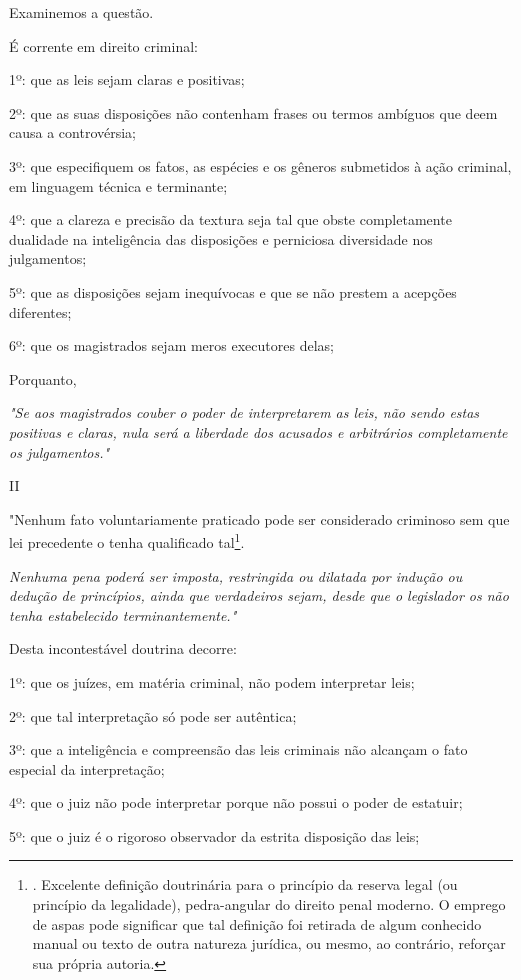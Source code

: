 Examinemos a questão.

É corrente em direito criminal:

1º: que as leis sejam claras e positivas;

2º: que as suas disposições não contenham frases ou termos ambíguos que
deem causa a controvérsia;

3º: que especifiquem os fatos, as espécies e os gêneros submetidos à
ação criminal, em linguagem técnica e terminante;

4º: que a clareza e precisão da textura seja tal que obste completamente
dualidade na inteligência das disposições e perniciosa diversidade nos
julgamentos;

5º: que as disposições sejam inequívocas e que se não prestem a acepções
diferentes;

6º: que os magistrados sejam meros executores delas;

Porquanto,

\emph{"Se aos magistrados couber o poder de interpretarem as leis, não
sendo estas positivas e claras, nula será a liberdade dos acusados e
arbitrários completamente os julgamentos."}

II

"Nenhum fato voluntariamente praticado pode ser considerado criminoso
sem que lei precedente o tenha qualificado tal\footnote{. Excelente
  definição doutrinária para o princípio da reserva legal (ou princípio
  da legalidade), pedra-angular do direito penal moderno. O emprego de
  aspas pode significar que tal definição foi retirada de algum
  conhecido manual ou texto de outra natureza jurídica, ou mesmo, ao
  contrário, reforçar sua própria autoria.}.

\emph{Nenhuma pena poderá ser imposta, restringida ou dilatada por
indução ou dedução de princípios, ainda que verdadeiros sejam, desde que
o legislador os não tenha estabelecido terminantemente."}

Desta incontestável doutrina decorre:

1º: que os juízes, em matéria criminal, não podem interpretar leis;

2º: que tal interpretação só pode ser autêntica;

3º: que a inteligência e compreensão das leis criminais não alcançam o
fato especial da interpretação;

4º: que o juiz não pode interpretar porque não possui o poder de
estatuir;

5º: que o juiz é o rigoroso observador da estrita disposição das leis;

